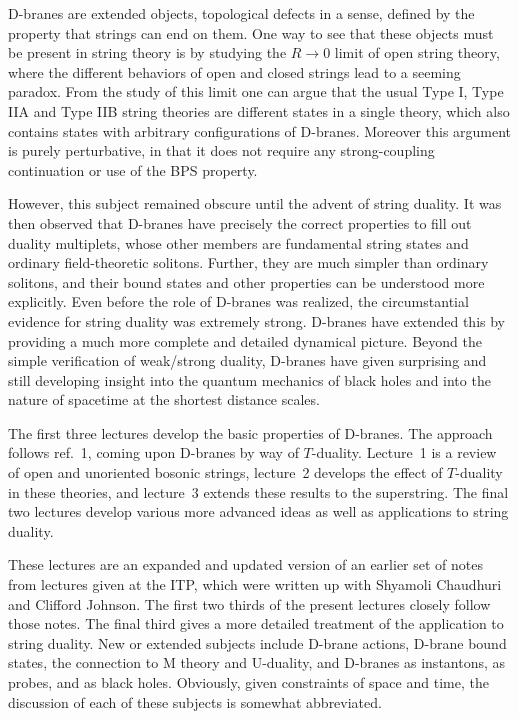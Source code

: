 D-branes are extended objects, topological defects in a sense, defined by the
property that strings can end on them.  One way to see that these objects 
must be present in string theory is by studying the
$R \to 0$ limit of open string theory, where the different behaviors of open
and closed strings lead to a seeming paradox.\cite{dlp}  From the study of
this limit one can argue that the usual Type I, Type IIA and Type IIB string
theories are different states in a single theory, which also contains states
with arbitrary configurations of D-branes.  Moreover this argument is purely
perturbative, in that it does not require any strong-coupling continuation or
use of the BPS property.  

However, this subject remained obscure until the advent of string duality.  It
was then observed that D-branes have precisely the correct properties to fill
out duality multiplets,\cite{joeone} whose other members are fundamental string
states and ordinary field-theoretic solitons.  Further, they are much simpler
than ordinary solitons, and their bound states and other properties can be
understood more explicitly.  Even before the role of D-branes was
realized, the circumstantial evidence for string duality was 
extremely strong.  D-branes have extended this by providing a much more
complete and detailed dynamical picture.
Beyond the simple verification of weak/strong duality, D-branes have given
surprising and still developing insight into the quantum mechanics of black
holes and into the nature of spacetime at the shortest distance scales.

The first three lectures develop the basic properties of D-branes.  The
approach follows ref.~1, coming upon D-branes by way of $T$-duality. 
Lecture~1
is a review of open and unoriented bosonic strings, lecture~2 develops the
effect of $T$-duality in these theories, and lecture~3 extends these results
to the superstring.  The final two lectures develop various more advanced
ideas as well as applications to string duality.

These lectures are an expanded and updated version of an earlier set of
notes from lectures given at the ITP, which were written up
with Shyamoli Chaudhuri and Clifford Johnson.\cite{dnotes}  The first two
thirds of the present lectures closely
follow those notes.  The final third gives a more detailed treatment of the
application to string duality.  New or extended subjects include D-brane
actions, D-brane bound states, the connection to M theory and U-duality, and
D-branes as instantons, as probes, and as black holes.  Obviously, given
constraints of space and time, the discussion of each of these subjects is
somewhat abbreviated.

